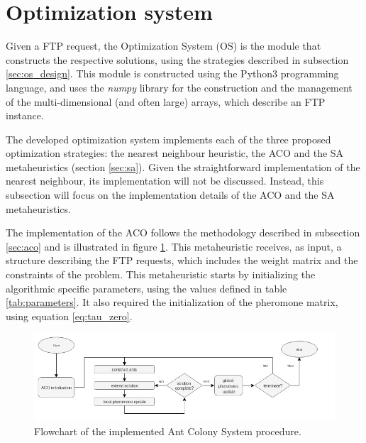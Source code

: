 \section{Optimization system}
\label{sec:os_implementation}

Given a FTP request, the Optimization System (OS) is the module that constructs the respective solutions, using the strategies described in subsection \ref{sec:os_design}. This module is constructed using the Python3 programming language, and uses the \textit{numpy} library \cite{numpy} for the construction and the management of the multi-dimensional (and often large) arrays, which describe an FTP instance.   

The developed optimization system implements each of the three proposed optimization strategies: the nearest neighbour heuristic, the ACO and the SA metaheuristics (section \ref{sec:sa}). Given the straightforward implementation of the nearest neighbour, its implementation will not be discussed. Instead, this subsection will focus on the implementation details of the ACO and the SA metaheuristics.

The implementation of the ACO follows the methodology described in subsection \ref{sec:aco} and is illustrated in figure \ref{fig:aco_flow}. This metaheuristic receives, as input, a structure describing the FTP requests, which includes the weight matrix  and the constraints of the problem. This metaheuristic starts by initializing the algorithmic specific parameters, using the values defined in table \ref{tab:parameters}. It also required the initialization of the pheromone matrix, using equation \ref{eq:tau_zero}. 

\begin{figure}[h]
  \centering
  \includegraphics[width=\textwidth]{./Figures/system_implementation/aco_flow.png}
  \caption{Flowchart of the implemented Ant Colony System procedure.}
  \label{fig:aco_flow}  
\end{figure}

